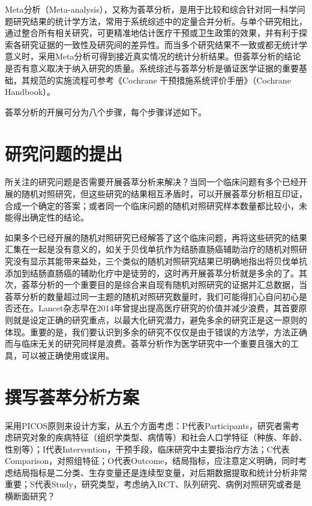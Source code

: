 \documentclass[
  chinese-hans,
  letterpaper,
  DIV=11,
  numbers=noendperiod]{scrreprt}
\begin{document}
Meta分析（Meta-analysis），又称为荟萃分析，是用于比较和综合针对同一科学问题研究结果的统计学方法，常用于系统综述中的定量合并分析。与单个研究相比，通过整合所有相关研究，可更精准地估计医疗干预或卫生政策的效果，并有利于探索各研究证据的一致性及研究间的差异性。而当多个研究结果不一致或都无统计学意义时，采用Meta分析可得到接近真实情况的统计分析结果。但荟萃分析的结论是否有意义取决于纳入研究的质量。系统综述与荟萃分析是循证医学证据的重要基础，其规范的实施流程可参考《Cochrane
干预措施系统评价手册》（Cochrane Handbook）。

荟萃分析的开展可分为八个步骤，每个步骤详述如下。

\section{研究问题的提出}\label{ux7814ux7a76ux95eeux9898ux7684ux63d0ux51fa}

所关注的研究问题是否需要开展荟萃分析来解决？当同一个临床问题有多个已经开展的随机对照研究，但这些研究的结果相互矛盾时，可以开展荟萃分析相互印证，合成一个确定的答案；或者同一个临床问题的随机对照研究样本数量都比较小，未能得出确定性的结论。

如果多个已经开展的随机对照研究已经解答了这个临床问题，再将这些研究的结果汇集在一起是没有意义的，如关于贝伐单抗作为结肠直肠癌辅助治疗的随机对照研究没有显示其能带来益处，三个类似的随机对照研究结果已明确地指出将贝伐单抗添加到结肠直肠癌的辅助化疗中是徒劳的，这时再开展荟萃分析就是多余的了。其次，荟萃分析的一个重要目的是综合来自现有随机对照研究的证据并汇总数据，当荟萃分析的数量超过同一主题的随机对照研究数量时，我们可能得扪心自问初心是否还在。Lancet杂志早在2014年曾提出提高医疗研究的价值并减少浪费，其首要原则就是设定正确的研究重点，以最大化研究潜力，避免多余的研究正是这一原则的体现。重要的是，我们要认识到多余的研究不仅仅是由于错误的方法学，方法正确而与临床无关的研究同样是浪费。荟萃分析作为医学研究中一个重要且强大的工具，可以被正确使用或误用。

\section{撰写荟萃分析方案}\label{ux64b0ux5199ux835fux8403ux5206ux6790ux65b9ux6848}

采用PICOS原则来设计方案，从五个方面考虑：P代表Participants，研究者需考虑研究对象的疾病特征（组织学类型、病情等）和社会人口学特征（种族、年龄、性别等）；I代表Intervention，干预手段，临床研究中主要指治疗方法；C代表Comparison，对照组特征；O代表Outcome，结局指标，应注意定义明确，同时考虑结局指标是二分类、生存变量还是连续型变量，对后期数据提取和统计分析非常重要；S代表Study，研究类型，考虑纳入RCT、队列研究、病例对照研究或者是横断面研究？
\end{document}
